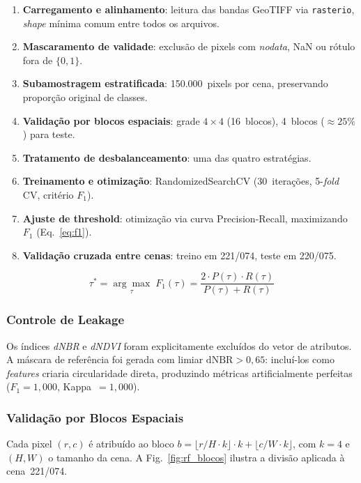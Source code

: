 \documentclass[conference]{IEEEtran}
\begin{document}
\begin{enumerate}
  \item \textbf{Carregamento e alinhamento}: leitura das bandas GeoTIFF via
        \texttt{rasterio}, \textit{shape} mínima comum entre todos os arquivos.
  \item \textbf{Mascaramento de validade}: exclusão de pixels com
        \textit{nodata}, NaN ou rótulo fora de $\{0,1\}$.
  \item \textbf{Subamostragem estratificada}: 150.000~pixels por cena,
        preservando proporção original de classes.
  \item \textbf{Validação por blocos espaciais}: grade $4\times4$
        (16~blocos), 4~blocos ($\approx25\%$) para teste.
  \item \textbf{Tratamento de desbalanceamento}: uma das quatro estratégias.
  \item \textbf{Treinamento e otimização}: RandomizedSearchCV (30~iterações,
        5-\textit{fold} CV, critério $F_1$).
  \item \textbf{Ajuste de threshold}: otimização via curva Precision-Recall,
        maximizando $F_1$ (Eq.~\ref{eq:f1}).
  \item \textbf{Validação cruzada entre cenas}: treino em 221/074,
        teste em 220/075.
\end{enumerate}

\begin{equation}
  \tau^* = \underset{\tau}{\arg\max}\;
  F_1(\tau) = \frac{2 \cdot P(\tau) \cdot R(\tau)}
                   {P(\tau) + R(\tau)}
  \label{eq:f1}
\end{equation}

\subsubsection{Controle de Leakage}

Os índices \textit{dNBR} e \textit{dNDVI} foram explicitamente excluídos
do vetor de atributos. A máscara de referência foi gerada com limiar
$\mathrm{dNBR} > 0{,}65$: incluí-los como \textit{features} criaria
circularidade direta, produzindo métricas artificialmente perfeitas
($F_1 = 1{,}000$, Kappa~$= 1{,}000$).

\subsubsection{Validação por Blocos Espaciais}

Cada pixel $(r,c)$ é atribuído ao bloco
$b = \lfloor r/H \cdot k \rfloor \cdot k + \lfloor c/W \cdot k \rfloor$,
com $k=4$ e $(H,W)$ o tamanho da cena. A Fig.~\ref{fig:rf_blocos} ilustra
a divisão aplicada à cena~221/074.
\end{document}
